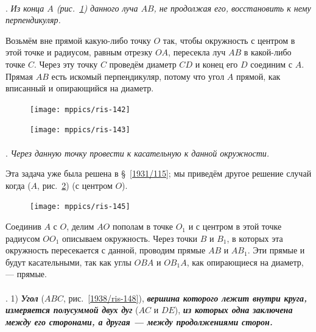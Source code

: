 \documentclass[oneside]{book}
\begin{document}
\paragraph{}\label{1938/127}
.
\emph{Из конца $A$ \emph{(рис.~\ref{1938/ris-143})} данного луча $AB$, не продолжая его, восстановить к нему перпендикуляр.}

Возьмём вне прямой какую-либо точку $O$ так, чтобы окружность с центром в этой точке и радиусом, равным отрезку $OA$, пересекла луч $AB$ в какой-либо точке $C$.
Через эту точку $C$ проведём диаметр $CD$ и конец его $D$ соединим с $A$.
Прямая $AB$ есть искомый перпендикуляр, потому что угол $A$ прямой, как вписанный и опирающийся на диаметр.

\begin{figure}[h]
\begin{minipage}{.48\textwidth}
\centering
\texttt{[image: mppics/ris-142]}
\caption{}\label{1938/ris-142}
\end{minipage}
\hfill
\begin{minipage}{.48\textwidth}
\centering
\texttt{[image: mppics/ris-143]}
\caption{}\label{1938/ris-143}
\end{minipage}
\end{figure}

\paragraph{}\label{1938/128}
.
\emph{Через данную точку провести к касательную к данной окружности.}

Эта задача уже  была решена в §~\ref{1931/115};
мы приведём другое решение случай когда  ($A$, рис.~\ref{1938/ris-145})  (с центром $O$).

\begin{figure}
\centering
\texttt{[image: mppics/ris-145]}
\caption{}\label{1938/ris-145}
\end{figure}

Соединив $A$ с $O$, делим $AO$ пополам в точке $O_1$ и с центром в этой точке радиусом $OO_1$ описываем окружность.
Через точки $B$ и $B_1$, в которых эта окружность пересекается с данной, проводим прямые $AB$ и $AB_1$.
Эти прямые и будут касательными, так как углы $OBA$ и $OB_1A$, как опирающиеся на диаметр, — прямые.




\paragraph{}\label{1938/130}
.
1) \textbf{\emph{Угол}} ($ABC$, рис.~\ref{1938/ris-148}), \textbf{\emph{вершина которого лежит внутри круга, измеряется полусуммой двух дуг}} ($AC$ и $DE$), \textbf{\emph{из которых одна заключена между его сторонами, а другая — между продолжениями сторон.}}
\end{document}
